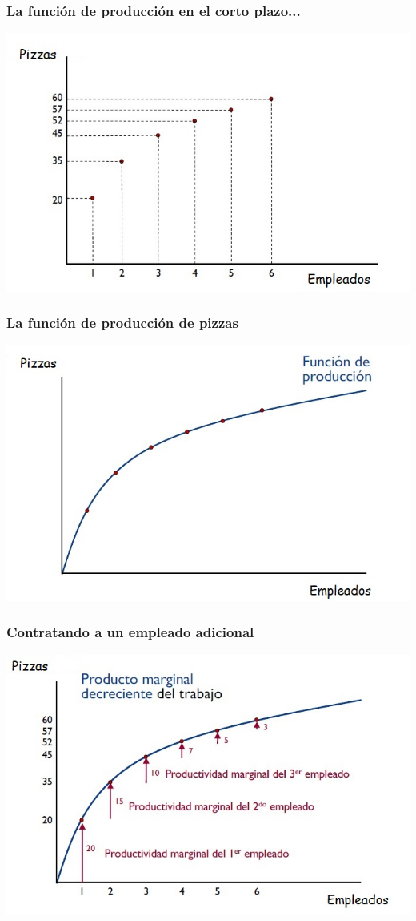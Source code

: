 \documentclass{beamer}
\begin{document}
\begin{frame}
\frametitle{La función de producción en el corto plazo...}
\centering
\includegraphics[scale=0.6]{Slides Principios de Economia/Figures/Tema_06.14_funciondeproduccionmedialunas.jpg}
\end{frame}

\begin{frame}
\frametitle{La función de producción de pizzas}
\centering
\includegraphics[scale=0.6]{Slides Principios de Economia/Figures/Tema_06.15.jpg}
\end{frame}

\begin{frame}
\frametitle{Contratando a un empleado adicional}
\centering
\includegraphics[scale=0.6]{Slides Principios de Economia/Figures/Tema_06.16.jpg}
\end{frame}
\end{document}
